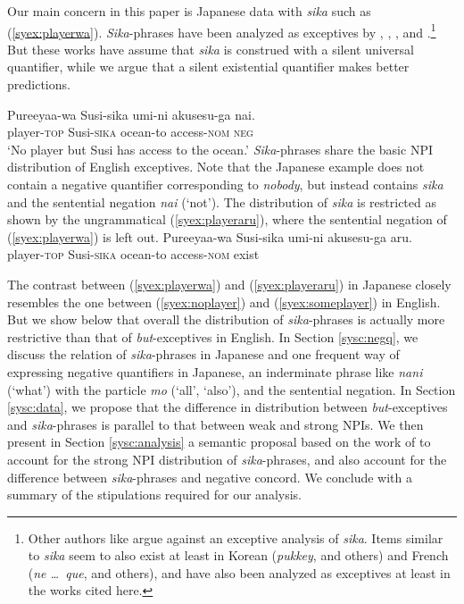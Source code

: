 \documentclass[output=paper,colorlinks,citecolor=brown,
]{langscibook}
\def\M#1{\textsc{#1}}
\begin{document}
Our main concern in this paper is Japanese data with \emph{sika} such as (\ref{syex:playerwa}).
\emph{Sika}-phrases have been analyzed as exceptives by \cite{alonso-ovalle04a}, \cite{yoshimura2007b}, \cite{kawahara08a}, and \cite{shimoyama11}.\footnote{Other authors like \cite{hasegawa11a} argue against an exceptive analysis of \emph{sika}. Items similar to \emph{sika} seem to also exist at least in Korean (\emph{pukkey}, \citealt{sells01a} and others) and French (\emph{ne \dots\ que}, \citealt{fintel07a} and others), and have also been analyzed as exceptives at least in the works cited here.}  But these works have assume that \emph{sika} is construed with a silent universal quantifier, while we argue that a silent existential quantifier makes better predictions.

\ea \label{syex:playerwa}
\gll Pureeyaa-wa Susi-sika umi-ni akusesu-ga nai.\\
player-\M{top} Susi-\M{sika} ocean-to access-\M{nom} \M{neg}\\
\glt `No player but Susi has access to the ocean.'\z
%
\emph{Sika}-phrases share the basic NPI distribution of English exceptives.
Note that the Japanese example does not contain a negative quantifier corresponding to \emph{nobody}, but instead contains \emph{sika} and the sentential negation \emph{nai} (`not').  The distribution of \emph{sika} is restricted as shown by the ungrammatical (\ref{syex:playeraru}), where the sentential negation of (\ref{syex:playerwa}) is left out.
\ea \label{syex:playeraru}
\gll *Pureeyaa-wa Susi-sika umi-ni akusesu-ga aru.\\
player-\M{top} Susi-\M{sika} ocean-to access-\M{nom} exist\\\z


The contrast between (\ref{syex:playerwa}) and (\ref{syex:playeraru}) in Japanese closely resembles the one between (\ref{syex:noplayer}) and (\ref{syex:someplayer}) in English.
But we show below that overall the distribution of \emph{sika}-phrases is actually more restrictive than that of \emph{but}-exceptives in English. In Section \ref{sysc:negq}, we discuss the relation of \emph{sika}-phrases in Japanese and one frequent way of expressing negative quantifiers in Japanese, an inderminate phrase like \emph{nani} (`what') with the particle \emph{mo} (`all', `also'), and the sentential negation.
In Section \ref{sysc:data}, we propose that the difference in distribution between \emph{but}-exceptives and \emph{sika}-phrases is parallel to that between weak and strong NPIs.
We then present in Section \ref{sysc:analysis} a semantic proposal based on the work of \cite{gajewski11a} to account for the strong NPI distribution of \emph{sika}-phrases, and also account for the difference between \emph{sika}-phrases and negative concord.  We conclude with a summary of the stipulations required for our analysis.
\end{document}
